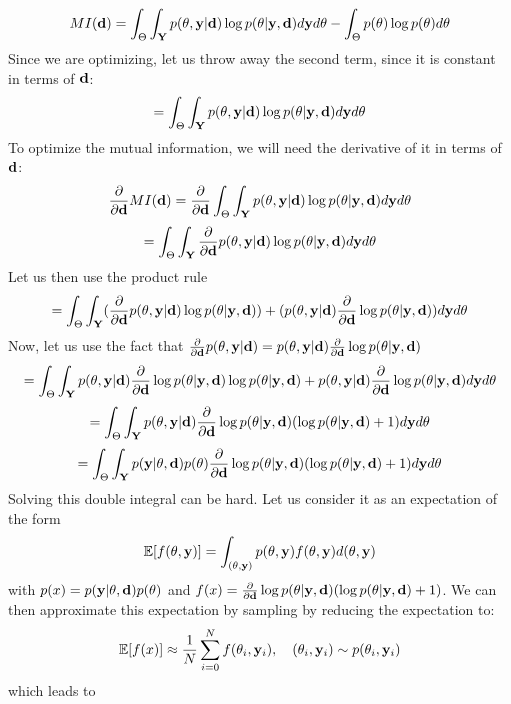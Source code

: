 $$MI(\mathbf{d})= \int_{\Theta}\int_{\mathbf{Y}}p(\mathbf{\theta}, \mathbf{y}|\mathbf{d})\log p(\mathbf{\theta}| \mathbf{y}, \mathbf{d}) d\mathbf{y}d\mathbf{\theta}- \int_\Theta p(\theta)\log p(\mathbf{\theta})d\mathbf{\theta}$$
Since we are optimizing, let us throw away the second term, since it is constant in terms of $\mathbf{d}$:
$$= \int_{\Theta}\int_{\mathbf{Y}}p(\mathbf{\theta}, \mathbf{y}|\mathbf{d})\log p(\mathbf{\theta}| \mathbf{y}, \mathbf{d}) d\mathbf{y}d\mathbf{\theta}$$
To optimize the mutual information, we will need the derivative of it in terms of $\mathbf{d}$:
$$\frac{\partial }{\partial \mathbf{d}}MI(\mathbf{d})= \frac{\partial }{\partial \mathbf{d}}\int_{\Theta}\int_{\mathbf{Y}}p(\mathbf{\theta}, \mathbf{y}|\mathbf{d})\log p(\mathbf{\theta}| \mathbf{y}, \mathbf{d}) d\mathbf{y}d\mathbf{\theta}$$
$$= \int_{\Theta}\int_{\mathbf{Y}}\frac{\partial }{\partial \mathbf{d}}p(\mathbf{\theta}, \mathbf{y}|\mathbf{d})\log p(\mathbf{\theta}| \mathbf{y}, \mathbf{d}) d\mathbf{y}d\mathbf{\theta}$$
Let us then use the product rule
$$= \int_{\Theta}\int_{\mathbf{Y}}(\frac{\partial }{\partial \mathbf{d}}p(\mathbf{\theta}, \mathbf{y}|\mathbf{d}) \log p(\mathbf{\theta}| \mathbf{y}, \mathbf{d}))
+ (p(\mathbf{\theta}, \mathbf{y}|\mathbf{d})\frac{\partial }{\partial \mathbf{d}}\log p(\mathbf{\theta}| \mathbf{y}, \mathbf{d}))
 d\mathbf{y}d\mathbf{\theta}$$
 Now, let us use the fact that $\frac{\partial }{\partial \mathbf{d}}p(\mathbf{\theta}, \mathbf{y}|\mathbf{d}) = p(\theta, \mathbf{y}|\mathbf{d})\frac{\partial }{\partial \mathbf{d}}\log p(\theta |\mathbf{y}, \mathbf{d})$ 
$$= \int_{\Theta}\int_{\mathbf{Y}}p(\theta, \mathbf{y}|\mathbf{d})\frac{\partial }{\partial \mathbf{d}}\log p(\theta |\mathbf{y}, \mathbf{d})\log p(\theta |\mathbf{y}, \mathbf{d})
+ p(\mathbf{\theta}, \mathbf{y}|\mathbf{d})\frac{\partial }{\partial \mathbf{d}}\log p(\mathbf{\theta}| \mathbf{y}, \mathbf{d})
 d\mathbf{y}d\mathbf{\theta}$$
$$= \int_{\Theta}\int_{\mathbf{Y}}p(\theta, \mathbf{y}|\mathbf{d})\frac{\partial }{\partial \mathbf{d}}\log p(\theta |\mathbf{y}, \mathbf{d})(\log p(\theta |\mathbf{y}, \mathbf{d}) + 1)
 d\mathbf{y}d\mathbf{\theta}$$
$$= \int_{\Theta}\int_{\mathbf{Y}}p(\mathbf{y}|\theta, \mathbf{d})p(\theta)\frac{\partial }{\partial \mathbf{d}}\log p(\theta |\mathbf{y}, \mathbf{d})(\log p(\theta |\mathbf{y}, \mathbf{d}) + 1)
 d\mathbf{y}d\mathbf{\theta}$$
 Solving this double integral can be hard. Let us consider it as an expectation of the form
 $$\mathbb{E}[f(\theta, \mathbf{y})]=\int_{(\theta, \mathbf{y})} p(\theta, \mathbf{y})f(\theta, \mathbf{y})d(\theta, \mathbf{y})$$
 with $p(x)=p(\mathbf{y}|\theta, \mathbf{d})p(\theta)$ and $f(x)=\frac{\partial }{\partial \mathbf{d}}\log p(\theta |\mathbf{y}, \mathbf{d})(\log p(\theta |\mathbf{y}, \mathbf{d}) + 1)$.
 We can then approximate this expectation by sampling by reducing the expectation to:
 $$\mathbb{E}[f(x)]\approx \frac{1}{N}\sum_{i=0}^Nf(\theta_i, \mathbf{y}_i),\quad (\theta_i, \mathbf{y}_i)\sim p(\theta_i, \mathbf{y}_i)$$
 which leads to
